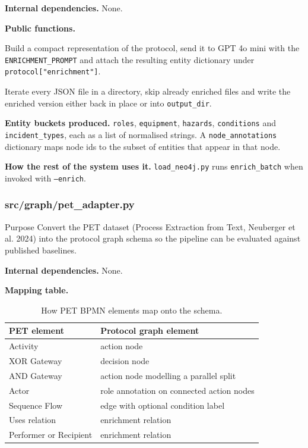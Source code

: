\documentclass{article}
\begin{document}
\textbf{Internal dependencies.} None.

\textbf{Public functions.}

\begin{description}[leftmargin=2em, style=nextline]
\item[\texttt{enrich\_protocol(protocol, model="gpt-4o-mini")}]
Build a compact representation of the protocol, send it to GPT 4o
mini with the \texttt{ENRICHMENT\_PROMPT} and attach the resulting
entity dictionary under \texttt{protocol["enrichment"]}.
\item[\texttt{enrich\_batch(directory,\allowbreak{} output\_dir=None,\allowbreak{} model="gpt-4o-mini")}]
Iterate every JSON file in a directory, skip already enriched files
and write the enriched version either back in place or into
\texttt{output\_dir}.
\end{description}

\textbf{Entity buckets produced.} \texttt{roles},
\texttt{equipment}, \texttt{hazards}, \texttt{conditions} and
\texttt{incident\_types}, each as a list of normalised strings. A
\texttt{node\_annotations} dictionary maps node ids to the subset of
entities that appear in that node.

\textbf{How the rest of the system uses it.}
\texttt{load\_neo4j.py} runs \texttt{enrich\_batch} when invoked with
\texttt{--enrich}.

\subsubsection{src/graph/pet\_adapter.py}

\begin{codeconceptbox}{Purpose}
Convert the PET dataset (Process Extraction from Text, Neuberger et
al. 2024) into the protocol graph schema so the pipeline can be
evaluated against published baselines.
\end{codeconceptbox}

\textbf{Internal dependencies.} None.

\textbf{Mapping table.}

\begin{table}[H]
\centering
\begin{tabularx}{\textwidth}{l X}
\toprule
\textbf{PET element} & \textbf{Protocol graph element} \\
\midrule
Activity                & action node \\
XOR Gateway             & decision node \\
AND Gateway             & action node modelling a parallel split \\
Actor                   & role annotation on connected action nodes \\
Sequence Flow           & edge with optional condition label \\
Uses relation           & enrichment relation \\
Performer or Recipient  & enrichment relation \\
\bottomrule
\end{tabularx}
\caption{How PET BPMN elements map onto the schema.}
\end{table}
\end{document}
